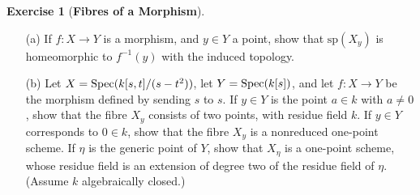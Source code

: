 \documentclass[11pt]{book}
\theoremstyle{definition}
\newtheorem{exercise}{Exercise}[section]
\begin{document}
\begin{exercise}[\textbf{Fibres of a Morphism}]
\mbox{}
\begin{itemize}
\item[(a)] If $f:X\to Y$ is a morphism, and $y\in Y$ a point, show that $\text{sp}(X_y)$ is homeomorphic to $f^{-1}(y)$ with the induced topology.
\item[(b)] Let $X=\mathrm{Spec}(k[s,t]/(s-t^2))$, let $Y=\mathrm{Spec}(k[s])$, and let $f:X\to Y$ be the morphism defined by sending $s$ to $s$. If $y\in Y$ is the point $a\in k$ with $a\neq 0$, show that the fibre $X_y$ consists of two points, with residue field $k$. If $y\in Y$ corresponds to $0\in k$, show that the fibre $X_y$ is a nonreduced one-point scheme. If $\eta$ is the generic point of $Y$, show that $X_\eta$ is a one-point scheme, whose residue field is an extension of degree two of the residue field of $\eta$. (Assume $k$ algebraically closed.) 
\end{itemize}
\end{exercise}
\end{document}
